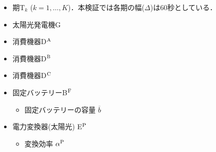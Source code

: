 \documentclass{jarticle}
\newcommand{\IB}{$\bullet$}
\newcommand{\IS}{$*$}
\begin{document}
\begin{itemize}
 \item[\IS] 期T$_k$ ($k=1,\ldots,K$)．本検証では各期の幅($\Delta$)は$60$秒としている．
 \item[\IS] 太陽光発電機G
 \item[\IS] 消費機器D$^{\rm A}$
 \item[\IS] 消費機器D$^{\rm B}$
 \item[\IS] 消費機器D$^{\rm C}$
 \item[\IS] 固定バッテリーB$^{\rm F}$
  \begin{itemize}
   \item[\IB] 固定バッテリーの容量 $\overline{b}$
  \end{itemize}
 \item[\IS] 電力変換器(太陽光) E$^{\rm P}$
  \begin{itemize}
   \item[\IB] 変換効率 $\alpha^{\rm P}$


\end{itemize}
\end{itemize}
\end{document}
